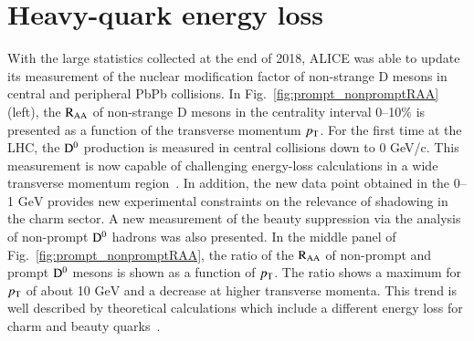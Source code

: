 \documentclass[3p,times,procedia]{elsarticle}
\newcommand{\GeV}{\mathrm{GeV}}
\newcommand{\pt}{p_{\rm T}}
\newcommand{\Dzero}{{\rm D^0}}
\newcommand{\RAA}{\rm R_{AA}}
\begin{document}
\section{Heavy-quark energy loss}
\label{eloss}
With the large statistics collected at the end of 2018, ALICE was able to update its measurement of the nuclear modification factor of 
non-strange D mesons in central and peripheral PbPb collisions. In Fig.~\ref{fig:prompt_nonpromptRAA} (left), the $\RAA$ of non-strange D mesons in the centrality 
interval 0--10$\%$ is presented as a function of the transverse momentum $\pt$. For the first time at the LHC, the $\Dzero$ production is measured 
in central collisions down to 0 GeV/c. This measurement is now capable of challenging energy-loss calculations in a wide 
transverse momentum region~\cite{bamps,tamu,phsd,sHQ,catania}. In addition, the new data point obtained in the 0--1 $\GeV$ provides new experimental constraints on the relevance of 
shadowing in the charm sector. A new measurement of the beauty suppression via the analysis of non-prompt $\Dzero$ hadrons 
was also presented. In the middle panel of Fig.~\ref{fig:prompt_nonpromptRAA}, the ratio of the $\RAA$ of non-prompt and prompt $\Dzero$ mesons is shown
as a function of $\pt$. The ratio shows a maximum for $\pt$ of about 10 $\GeV$ and a decrease at higher transverse momenta. This trend is well 
described by theoretical calculations which include a different energy loss for charm and beauty quarks~\cite{tamu,sHQ,cujet3}. 
\end{document}
